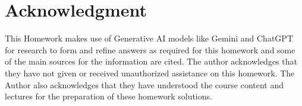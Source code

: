 \documentclass[a4paper,12pt]{article}
\begin{document}
\section*{Acknowledgment}
This Homework makes use of  Generative AI models like Gemini and ChatGPT for research to form and refine answers as required for this homework and some of the main sources for the information are cited. The author acknowledges that they have not given or received unauthorized assistance on this homework. The Author also acknowledges that they have understood the course content and lectures for the preparation of these homework solutions.
\end{document}
